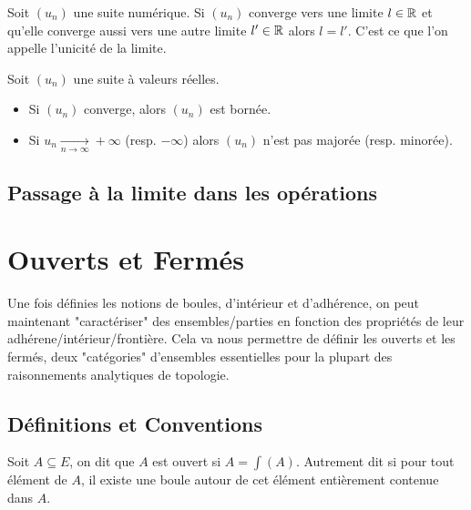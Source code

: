 \begin{prop}
    Soit $(u_n)$ une suite numérique. 
    Si $(u_n)$ converge vers une limite $l \in \mathbb{R}$ et qu'elle converge aussi vers une autre limite $l' \in \mathbb{R}$ alors 
    $l = l'$. C'est ce que l'on appelle l'unicité de la limite. 
\end{prop}

\begin{prop}
    Soit $(u_n)$ une suite à valeurs réelles. 
    \begin{itemize}
        \item Si $(u_n)$ converge, alors $(u_n)$ est bornée. 
        \item Si $u_n \underset{n \to \infty}{\longrightarrow} + \infty$ (resp. $- \infty$) alors $(u_n)$ n'est pas majorée (resp. minorée). 
    \end{itemize}
\end{prop}

\subsection{Passage à la limite dans les opérations}





\section{Ouverts et Fermés}

Une fois définies les notions de boules, d'intérieur et d'adhérence, on peut maintenant "caractériser" 
des ensembles/parties en fonction des propriétés de leur adhérene/intérieur/frontière. 
Cela va nous permettre de définir les ouverts et les fermés, deux "catégories" d'ensembles essentielles pour 
la plupart des raisonnements analytiques de topologie. 


\subsection{Définitions et Conventions}

\begin{definition}
    Soit $A \subseteq E$, on dit que $A$ est ouvert si $A = \int(A)$. 
    Autrement dit si pour tout élément de $A$, il existe une boule autour de cet élément entièrement 
    contenue dans $A$. 
\end{definition}

